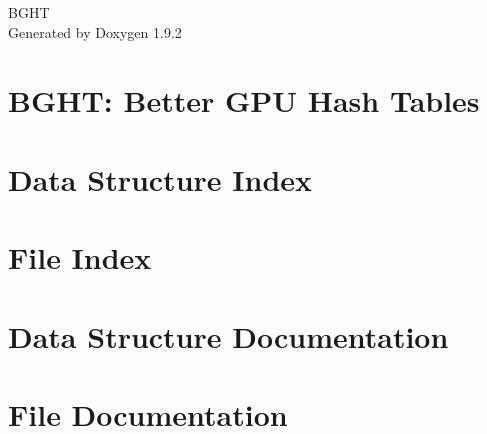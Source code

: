 \documentclass[twoside]{book}
\newcommand{\+}{\discretionary{\mbox{\scriptsize$\hookleftarrow$}}{}{}}
\newcommand{\clearemptydoublepage}{%
    \newpage{\pagestyle{empty}\cleardoublepage}%
  }
\begin{document}
  \raggedbottom
    \hypersetup{pageanchor=false,
                bookmarksnumbered=true,
                pdfencoding=unicode
               }
  \begin{titlepage}
  \vspace*{7cm}
  \begin{center}%
  {\Large BGHT}\\
  \vspace*{1cm}
  {\large Generated by Doxygen 1.9.2}\\
  \end{center}
  \end{titlepage}
  \clearemptydoublepage
  \tableofcontents
  \clearemptydoublepage
  \hypersetup{pageanchor=true}
\chapter{BGHT\+: Better GPU Hash Tables}
\label{index}\hypertarget{index}{}
\chapter{Data Structure Index}

\chapter{File Index}

\chapter{Data Structure Documentation}




\chapter{File Documentation}











  \backmatter
  \newpage
  \clearemptydoublepage
  \printindex
\end{document}
